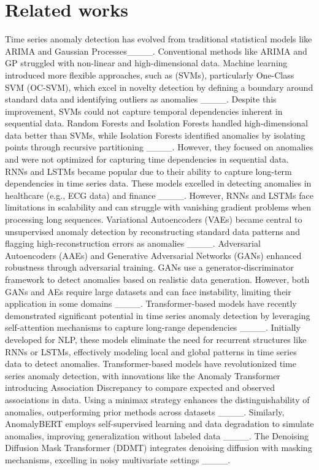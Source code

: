 \section{Related works}
Time series anomaly detection has evolved from traditional statistical models like ARIMA and Gaussian Processes____. Conventional methods like ARIMA and GP struggled with non-linear and high-dimensional data. Machine learning introduced more flexible approaches, such as  (SVMs), particularly One-Class SVM (OC-SVM), which excel in novelty detection by defining a boundary around standard data and identifying outliers as anomalies ____. Despite this improvement, SVMs could not capture temporal dependencies inherent in sequential data.
Random Forests and  Isolation Forests handled high-dimensional data better than SVMs, while Isolation Forests identified anomalies by isolating points through recursive partitioning ____. However, they focused on anomalies and were not optimized for capturing time dependencies in sequential data. RNNs and  LSTMs became popular due to their ability to capture long-term dependencies in time series data. These models excelled in detecting anomalies in healthcare (e.g., ECG data) and finance ____. However, RNNs and LSTMs face limitations in scalability and can struggle with vanishing gradient problems when processing long sequences.
Variational Autoencoders (VAEs) became central to unsupervised anomaly detection by reconstructing standard data patterns and flagging high-reconstruction errors as anomalies ____. Adversarial Autoencoders (AAEs) and Generative Adversarial Networks (GANs) enhanced robustness through adversarial training. GANs use a generator-discriminator framework to detect anomalies based on realistic data generation. However, both GANs and AEs require large datasets and can face instability, limiting their application in some domains ____.
Transformer-based models have recently demonstrated significant potential in time series anomaly detection by leveraging self-attention mechanisms to capture long-range dependencies ____. Initially developed for NLP, these models eliminate the need for recurrent structures like RNNs or LSTMs, effectively modeling local and global patterns in time series data to detect anomalies.
Transformer-based models have revolutionized time series anomaly detection, with innovations like the Anomaly Transformer introducing Association Discrepancy to compare expected and observed associations in data. Using a minimax strategy enhances the distinguishability of anomalies, outperforming prior methods across datasets ____. Similarly, AnomalyBERT employs self-supervised learning and data degradation to simulate anomalies, improving generalization without labeled data ____. The Denoising Diffusion Mask Transformer (DDMT) integrates denoising diffusion with masking mechanisms, excelling in noisy multivariate settings ____.
